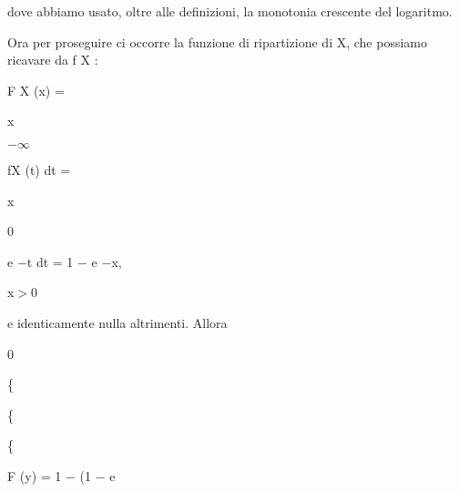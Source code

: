 \documentclass[a4paper,portrait,12pt]{article}
\begin{document}
\begin{flushleft}
dove abbiamo usato, oltre alle definizioni, la monotonia crescente del logaritmo.
\end{flushleft}


\begin{flushleft}
Ora per proseguire ci occorre la funzione di ripartizione di X, che possiamo ricavare da f X :
\end{flushleft}


\begin{flushleft}
F X (x) =
\end{flushleft}





\begin{flushleft}
x
\end{flushleft}


$-$$\infty$





\begin{flushleft}
fX (t) dt =
\end{flushleft}





\begin{flushleft}
x
\end{flushleft}


0





\begin{flushleft}
e $-$t dt = 1 $-$ e $-$x,
\end{flushleft}





\begin{flushleft}
x$>$0
\end{flushleft}





\begin{flushleft}
e identicamente nulla altrimenti. Allora
\end{flushleft}


0


\{


\{


\{


\begin{flushleft}
F (y) = 1 $-$ (1 $-$ e
\end{flushleft}
\end{document}
